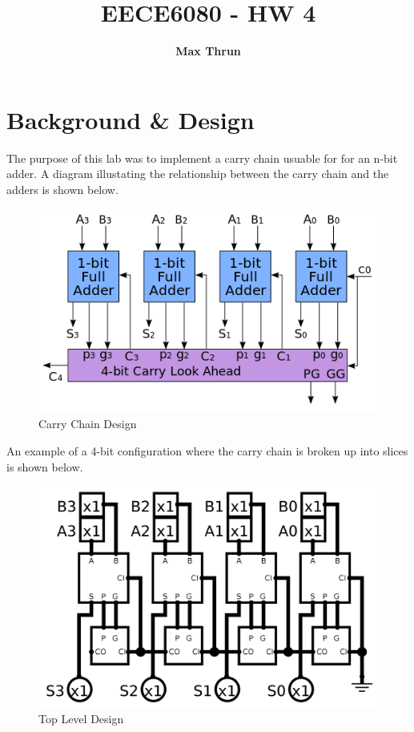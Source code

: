 \documentclass{article}
\title{
    \vspace{2in}
    \textmd{\textbf{EECE6080 - HW 4}}\\
    \vspace{4in}
}
\author{\textbf{Max Thrun}}
\begin{document}
\maketitle

\newpage
\section*{Background \& Design}

The purpose of this lab was to implement a carry chain usuable for for an n-bit
adder. A diagram illustating the relationship between the carry chain and the
adders is shown below.

\begin{figure}[H]
    \centering
    \includegraphics[width=0.8\linewidth]{../4-bit_carry_lookahead_adder.png}
    \caption{Carry Chain Design}
\end{figure}

An example of a 4-bit configuration where the carry chain is broken up into
slices is shown below.

\begin{figure}[H]
    \centering
    \includegraphics[width=0.8\linewidth]{../logisim_top.png}
    \caption{Top Level Design}
\end{figure}
\end{document}
